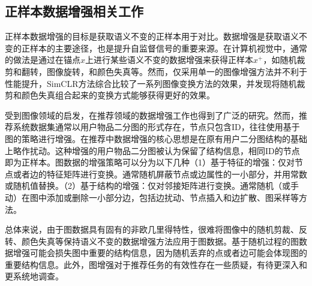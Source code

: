 \subsection{正样本数据增强相关工作}
正样本数据增强的目标是获取语义不变的正样本用于对比。数据增强是获取语义不变的正样本的主要途径，也是提升自监督信号的重要来源。在计算机视觉中，通常的做法是通过在锚点$x$上进行某些语义不变的数据增强来获得正样本$x^+$，如随机裁剪和翻转\cite{Oord:2018:arxiv}，图像旋转\cite{Komodakis:2018:ICLR}，和颜色失真\cite{Szegedy:2015:CVPR}等。然而，仅采用单一的图像增强方法并不利于性能提升，SimCLR\cite{Chen:2020:ICML}方法综合比较了一系列图像变换方法的效果，并发现将随机裁剪和颜色失真组合起来的变换方式能够获得更好的效果。

受到图像领域的启发，在推荐领域的数据增强工作也得到了广泛的研究。然而，推荐系统数据集通常以用户物品二分图的形式存在，节点只包含ID，往往使用基于图的策略进行增强。在推荐中数据增强的核心思想是在原有用户二分图结构的基础上略作扰动。这种增强的用户物品二分图被认为保留了结构信息，相同ID的节点即为正样本。图数据的增强策略可以分为以下几种（1）基于特征的增强\cite{liu2022local,velivckovic2018deep,zhu2020deep,you2020graph,pmlr-v139-you21a}：仅对节点或者边的特征矩阵进行变换。通常随机屏蔽节点或边属性的一小部分，并用常数或随机值替换。（2）基于结构的增强\cite{pmlr-v119-zheng20d,10.1145/3437963.3441734,10.1145/3437963.3441720,page1998pagerank}：仅对邻接矩阵进行变换。通常随机（或手动）在图中添加或删除一小部分边，包括边扰动\cite{pmlr-v119-zheng20d,10.1145/3437963.3441734}、节点插入\cite{10.1145/3437963.3441720}和边扩散\cite{page1998pagerank}、图采样\cite{pmlr-v119-zheng20d}等方法。


总体来说，由于图数据具有固有的非欧几里得特性，很难将图像中的随机剪裁、反转、颜色失真等保持语义不变的数据增强方法应用于图数据。基于随机过程的图数据增强可能会损失图中重要的结构信息，因为随机丢弃的点或者边可能会体现图的重要结构信息。此外，图增强对于推荐任务的有效性存在一些质疑\cite{yu2022graph}，有待更深入和更系统地调查。

